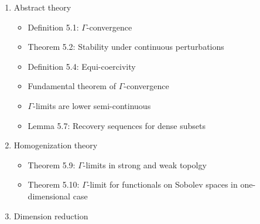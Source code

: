 \documentclass[12pt,a4paper]{article}
\begin{document}
\begin{enumerate}
\begin{enumerate}
        \item Abstract theory
        \begin{itemize}
        \item Definition 5.1: $\Gamma$-convergence
        \item Theorem 5.2: Stability under continuous perturbations
        \item Definition 5.4: Equi-coercivity
        \item Fundamental theorem of $\Gamma$-convergence
        \item $\Gamma$-limits are lower semi-continuous
        \item Lemma 5.7: Recovery sequences for dense subsets
        \end{itemize}
        \item Homogenization theory
        \begin{itemize}
        \item Theorem 5.9: $\Gamma$-limits in strong and weak topolgy
        \item Theorem 5.10: $\Gamma$-limit for functionals on Sobolev spaces in one-dimensional case
        \end{itemize}
        \item Dimension reduction
    \end{enumerate}
\end{enumerate}
\end{document}
